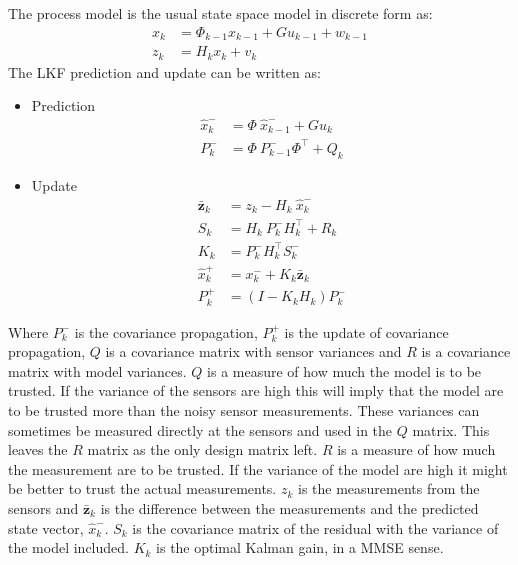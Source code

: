 The process model is the usual state space model in discrete form as:
\begin{align}
x_k &= \Phi_{k-1} x_{k-1} + G u_{k-1} + w_{k-1}\\
z_k &= H_k x_k + v_k
\end{align}
\noindent The \ac{LKF} prediction and update can be written as:
\begin{itemize}\tightlist
\item Prediction
\begin{align}
\hat x_k^- &= \Phi\ \hat x_{k-1}^- + G u_k \\
P_k^- &= \Phi\ P_{k-1}^- \Phi^\top + Q_{k}
\end{align}
\item Update
\begin{align}
\bar{\mathbf{z}}_k &= z_k - H_k\ \hat x_k^-\\
S_k &= H_k\ P_k^-H_k^\top + R_k\\
K_k &= P_k^-H_k^\top S_k^-\\
\hat x_k^+ &= x_k^- + K_k \bar{\mathbf{z}}_k\\
P_k^+ &= (I - K_k H_k) P_k^-
\end{align}
\end{itemize}
%
Where $P_{k}^-$ is the covariance propagation, $P_{k}^+$ is the update of covariance propagation, $Q$ is a covariance matrix with sensor variances and $R$ is a covariance matrix with model variances. $Q$ is a measure of how much the model is to be trusted. If the variance of the sensors are high this will imply that the model are to be trusted more than the noisy sensor measurements. These variances can sometimes be measured directly at the sensors and used in the $Q$ matrix. This leaves the $R$ matrix as the only design matrix left. $R$ is a measure of how much the measurement are to be trusted. If the variance of the model are high it might be better to trust the actual measurements. $z_k$ is the measurements from the sensors and $\bar{\mathbf{z}}_k$ is the difference between the measurements and the predicted state vector, $\hat x_k^-$. $S_k$ is the covariance matrix of the residual with the variance of the model included. $K_k$ is the optimal Kalman gain, in a \ac{MMSE} sense. 

